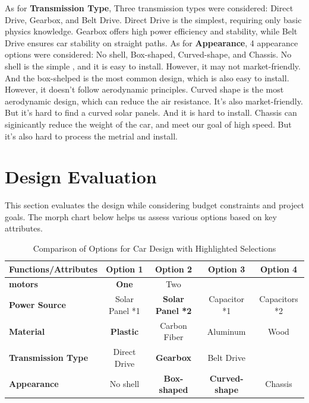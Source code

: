 \documentclass[12pt]{article}
\begin{document}
As for \textbf{Transmission Type}, Three transmission types were considered: Direct Drive, Gearbox, and Belt Drive. Direct Drive is the simplest,
requiring only basic physics knowledge. Gearbox offers high power efficiency and stability, 
while Belt Drive ensures car stability on straight paths.
\newline
\newline
As for \textbf{Appearance}, 4 appearance options were considered: No shell, Box-shaped, Curved-shape, and Chassis.
No shell is the simple , and it is easy to install. However, it may not market-friendly.
And the box-shelped is the most common design, which is also easy to install. However, it doesn't follow aerodynamic principles.
Curved shape is the most aerodynamic design, which can reduce the air resistance. It's also market-friendly. But it's hard to find a 
curved solar panels. And it is hard to install. Chassis can siginicantly reduce the weight of the car, and meet our goal of high speed.
But it's also hard to process the metrial and install.
\section{Design Evaluation}
This section evaluates the design while considering budget constraints and project goals. 
The morph chart below helps us assess various options based on key attributes.

\begin{table}[h!]
\centering
\begin{tabular}{|>{\bfseries}l|c|c|c|c|}
\hline
\textbf{Functions/Attributes} & \textbf{Option 1} & \textbf{Option 2} & \textbf{Option 3} & \textbf{Option 4} \\
\hline
motors & \cellcolor{highlight}\textbf{One} & Two &  &  \\
\hline
Power Source & Solar Panel *1 & \cellcolor{highlight}\textbf{Solar Panel *2} & Capacitor *1 &\cellcolor{highlight}Capacitors *2 \\
\hline
Material & \cellcolor{highlight}\textbf{Plastic} & Carbon Fiber & Aluminum & Wood \\
\hline
Transmission Type & Direct Drive & \cellcolor{highlight}\textbf{Gearbox} & Belt Drive &  \\
\hline
Appearance & No shell & \cellcolor{highlight}\textbf{Box-shaped} & \cellcolor{highlight}\textbf{Curved-shape} & Chassis\\
\hline

\end{tabular}
\caption{Comparison of Options for Car Design with Highlighted Selections}
\end{table}
\end{document}
